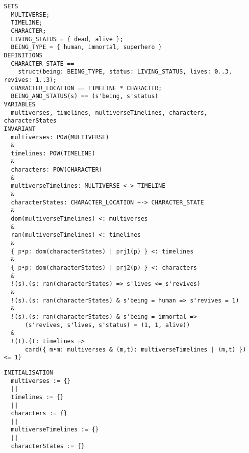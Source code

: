 \documentclass{article}
\begin{document}
\begin{verbatim}
SETS 
  MULTIVERSE;
  TIMELINE;
  CHARACTER;
  LIVING_STATUS = { dead, alive };
  BEING_TYPE = { human, immortal, superhero }
DEFINITIONS
  CHARACTER_STATE == 
    struct(being: BEING_TYPE, status: LIVING_STATUS, lives: 0..3, revives: 1..3);
  CHARACTER_LOCATION == TIMELINE * CHARACTER;
  BEING_AND_STATUS(s) == (s'being, s'status) 
VARIABLES
  multiverses, timelines, multiverseTimelines, characters, characterStates
INVARIANT
  multiverses: POW(MULTIVERSE)
  &
  timelines: POW(TIMELINE)
  & 
  characters: POW(CHARACTER)
  &
  multiverseTimelines: MULTIVERSE <-> TIMELINE
  &
  characterStates: CHARACTER_LOCATION +-> CHARACTER_STATE
  &
  dom(multiverseTimelines) <: multiverses
  &
  ran(multiverseTimelines) <: timelines
  &
  { p•p: dom(characterStates) | prj1(p) } <: timelines
  &
  { p•p: dom(characterStates) | prj2(p) } <: characters
  &
  !(s).(s: ran(characterStates) => s'lives <= s'revives)
  &
  !(s).(s: ran(characterStates) & s'being = human => s'revives = 1)
  &
  !(s).(s: ran(characterStates) & s'being = immortal =>
      (s'revives, s'lives, s'status) = (1, 1, alive))
  &
  !(t).(t: timelines => 
      card({ m•m: multiverses & (m,t): multiverseTimelines | (m,t) }) <= 1)
\end{verbatim}

\begin{verbatim}
INITIALISATION
  multiverses := {}
  ||
  timelines := {}
  ||
  characters := {}
  ||
  multiverseTimelines := {}
  ||
  characterStates := {}
\end{verbatim}
\end{document}
